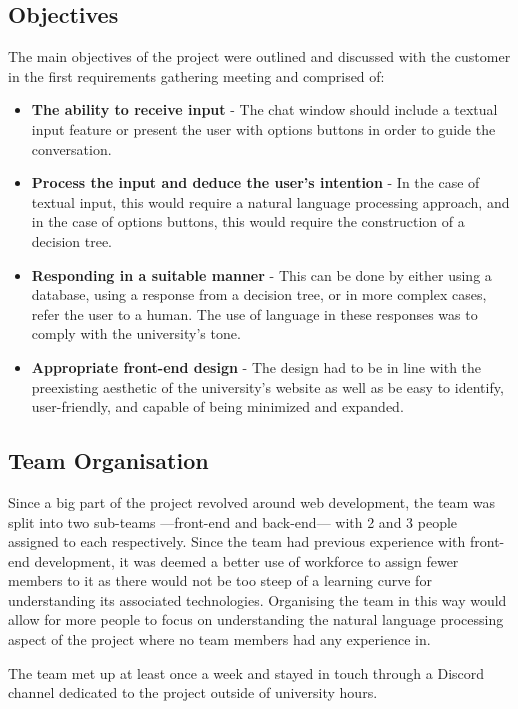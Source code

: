 \documentclass{l3proj}
\begin{document}
\subsection{Objectives}
\label{subsec:obj}
The main objectives of the project were outlined and discussed with the customer in the first requirements gathering meeting and comprised of:
\begin{itemize}
    \item \textbf{The ability to receive input} - The chat window should include a textual input feature or present the user with options buttons in order to guide the conversation.
    \item \textbf{Process the input and deduce the user's intention} - In the case of textual input, this would require a natural language processing approach, and in the case of options buttons, this would require the construction of a decision tree.
    \item \textbf{Responding in a suitable manner} - This can be done by either using a database, using a response from a decision tree, or in more complex cases, refer the user to a human. The use of language in these responses was to comply with the university's tone. \cite{UOFGBRANDTONE}
    \item \textbf{Appropriate front-end design} - The design had to be in line with the preexisting aesthetic \cite{UOFGBRANDCOLOUR} of the university's website as well as be easy to identify, user-friendly, and capable of being minimized and expanded.
\end{itemize}

\subsection{Team Organisation}
\label{subsec:teamorg}
Since a big part of the project revolved around web development, the team was split into two sub-teams ---front-end and back-end--- with 2 and 3 people assigned to each respectively. Since the team had previous experience with front-end development, it was deemed a better use of workforce to assign fewer members to it as there would not be too steep of a learning curve for understanding its associated technologies. Organising the team in this way would allow for more people to focus on understanding the natural language processing aspect of the project where no team members had any experience in.

The team met up at least once a week and stayed in touch through a Discord channel dedicated to the project outside of university hours.
\end{document}
